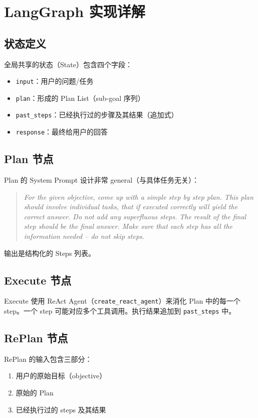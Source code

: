\section{LangGraph 实现详解}

\subsection{状态定义}

全局共享的状态（State）包含四个字段：
\begin{itemize}
    \item \texttt{input}：用户的问题/任务
    \item \texttt{plan}：形成的 Plan List（sub-goal 序列）
    \item \texttt{past\_steps}：已经执行过的步骤及其结果（追加式）
    \item \texttt{response}：最终给用户的回答
\end{itemize}

\subsection{Plan 节点}

Plan 的 System Prompt 设计非常 general（与具体任务无关）：
\begin{quote}
\textit{For the given objective, come up with a simple step by step plan. This plan should involve individual tasks, that if executed correctly will yield the correct answer. Do not add any superfluous steps. The result of the final step should be the final answer. Make sure that each step has all the information needed -- do not skip steps.}
\end{quote}

输出是结构化的 Steps 列表。

\subsection{Execute 节点}

Execute 使用 ReAct Agent（\texttt{create\_react\_agent}）来消化 Plan 中的每一个 step。一个 step 可能对应多个工具调用。执行结果追加到 \texttt{past\_steps} 中。

\subsection{RePlan 节点}

RePlan 的输入包含三部分：
\begin{enumerate}
    \item 用户的原始目标（objective）
    \item 原始的 Plan
    \item 已经执行过的 steps 及其结果
\end{enumerate}

